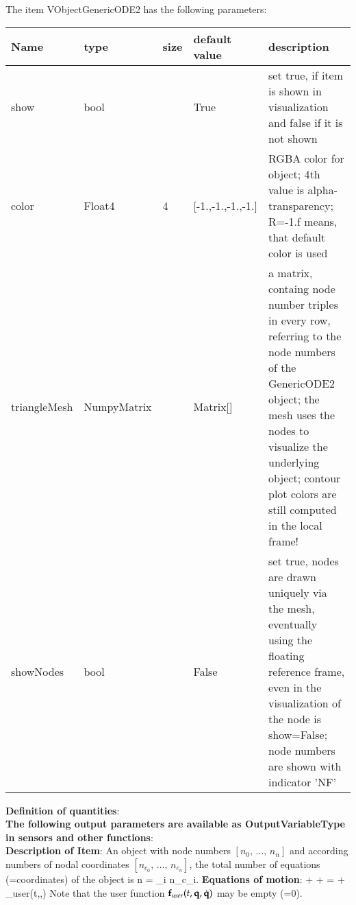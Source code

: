The item VObjectGenericODE2 has the following parameters:\vspace{-1cm}\\ 
\begin{center}
  \footnotesize
  \begin{longtable}{| p{4.5cm} | p{2.5cm} | p{0.5cm} | p{2.5cm} | p{6cm} |}
    \hline
    \bf Name & \bf type & \bf size & \bf default value & \bf description \\ \hline
    show &     bool &      &     True &     set true, if item is shown in visualization and false if it is not shown\\ \hline
    color &     Float4 &     4 &     [-1.,-1.,-1.,-1.] &     RGBA color for object; 4th value is alpha-transparency; R=-1.f means, that default color is used\\ \hline
    triangleMesh &     NumpyMatrix &      &     Matrix[] &     a matrix, containg node number triples in every row, referring to the node numbers of the GenericODE2 object; the mesh uses the nodes to visualize the underlying object; contour plot colors are still computed in the local frame!\\ \hline
    showNodes &     bool &      &     False &     set true, nodes are drawn uniquely via the mesh, eventually using the floating reference frame, even in the visualization of the node is show=False; node numbers are shown with indicator 'NF'\\ \hline
	  \end{longtable}
	\end{center}
{\bf Definition of quantities}:\\
\finishTable
{\bf The following output parameters are available as OutputVariableType in sensors and other functions}:\\ 
\finishTable
{\bf Description of Item}:
 \noindent
    An object with node numbers $[n_0,\,\ldots,\,n_n]$ and according numbers of nodal coordinates $[n_{c_0},\,\ldots,\,n_{c_n}]$, the total number of equations (=coordinates) of the object is
    \be
      n = \sum_{i} n_{c_i}.
    \ee
    {\bf Equations of motion}:
    \be \label{eq_ObjectGenericODE2_EOM}
      \Mm \ddot \qv + \Dm \dot \qv + \Km \qv = \fv + \fv_{user}(t,\qv,\dot \qv)
    \ee
    Note that the user function $\mathbf{f}_{user}(t,\mathbf{q},\dot {\mathbf{q}})$ may be empty (=0). 
    
